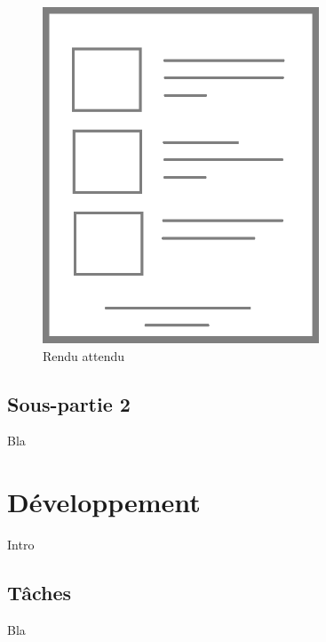 \begin{figure}[!h]
\begin{center}
\includegraphics[height=10cm]{besoins/rendu}
\end{center}
\caption{Rendu attendu}
\end{figure}

\subsection{Sous-partie 2}

Bla

\newpage

\section{Développement}

Intro

\subsection{Tâches}

Bla\\


